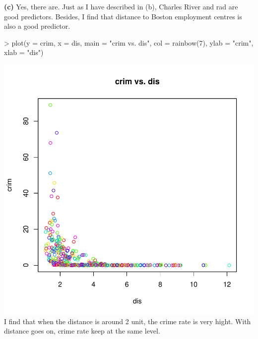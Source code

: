 \documentclass[a4paper]{article}
\renewcommand{\part}[1] {\vspace{.10in} {\bf (#1)}}
\begin{document}
\part{c}
Yes, there are. Just as I have described in (b), Charles River and rad are good predictors. Besides, I find that distance to Boston employment centres is also a good predictor.
\begin{Schunk}
\begin{Sinput}
> plot(y = crim, x = dis, main = "crim vs. dis", col = rainbow(7), ylab = "crim", xlab = "dis")
\end{Sinput}
\end{Schunk}
\includegraphics{lm-crime}
{\color{red}\\
I find that when the distance is around 2 unit, the crime rate is very hight. With distance goes on, crime rate keep at the same level.
}
\end{document}
